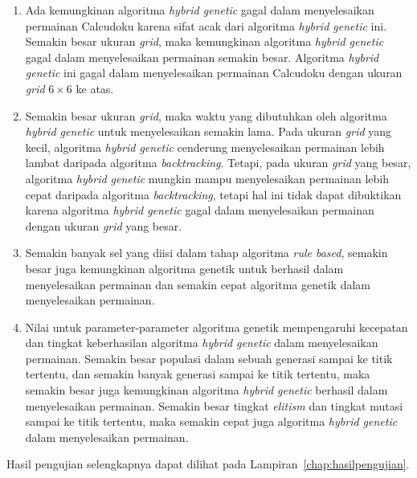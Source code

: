 \begin{enumerate}
\item Ada kemungkinan algoritma \textit{hybrid genetic} gagal dalam menyelesaikan permainan Calcudoku karena sifat acak dari algoritma \textit{hybrid genetic} ini. Semakin besar ukuran \textit{grid}, maka kemungkinan algoritma \textit{hybrid genetic} gagal dalam menyelesaikan permainan semakin besar. Algoritma \textit{hybrid genetic} ini gagal dalam menyelesaikan permainan Calcudoku dengan ukuran \textit{grid} \begin{math}6 \times 6\end{math} ke atas.
\item Semakin besar ukuran \textit{grid}, maka waktu yang dibutuhkan oleh algoritma \textit{hybrid genetic} untuk menyelesaikan semakin lama. Pada ukuran \textit{grid} yang kecil, algoritma \textit{hybrid genetic} cenderung menyelesaikan permainan lebih lambat daripada algoritma \textit{backtracking}. Tetapi, pada ukuran \textit{grid} yang besar, algoritma \textit{hybrid genetic} mungkin mampu menyelesaikan permainan lebih cepat daripada algoritma \textit{backtracking}, tetapi hal ini tidak dapat dibuktikan karena algoritma \textit{hybrid genetic} gagal dalam menyelesaikan permainan dengan ukuran \textit{grid} yang besar.
\item Semakin banyak sel yang diisi dalam tahap algoritma \textit{rule based}, semakin besar juga kemungkinan algoritma genetik untuk berhasil dalam menyelesaikan permainan dan semakin cepat algoritma genetik dalam menyelesaikan permainan.
\item Nilai untuk parameter-parameter algoritma genetik mempengaruhi kecepatan dan tingkat keberhasilan algoritma \textit{hybrid genetic} dalam menyelesaikan permainan. Semakin besar populasi dalam sebuah generasi sampai ke titik tertentu, dan semakin banyak generasi sampai ke titik tertentu, maka semakin besar juga kemungkinan algoritma \textit{hybrid genetic} berhasil dalam menyelesaikan permainan. Semakin besar tingkat \textit{elitism} dan tingkat mutasi sampai ke titik tertentu, maka semakin cepat juga algoritma \textit{hybrid genetic} dalam menyelesaikan permainan.
\end{enumerate}

Hasil pengujian selengkapnya dapat dilihat pada Lampiran~\ref{chap:hasilpengujian}.